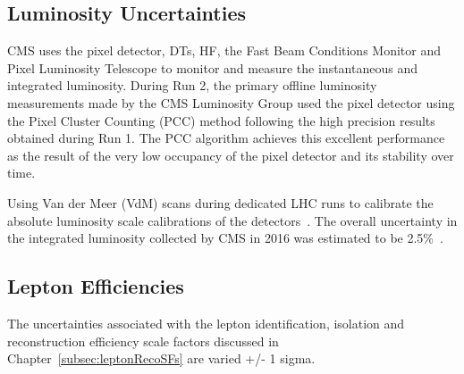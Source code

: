 \subsection{Luminosity Uncertainties}
CMS uses the pixel detector, DTs, HF, the Fast Beam Conditions Monitor and Pixel Luminosity Telescope to monitor and measure the instantaneous and integrated luminosity.
During Run 2, the primary offline luminosity measurements made by the CMS Luminosity Group used the pixel detector using the Pixel Cluster Counting (PCC) method following the high precision results obtained during Run 1.
The PCC algorithm achieves this excellent performance as the result of the very low occupancy of the pixel detector and its stability over time.


Using Van der Meer (VdM) scans during dedicated LHC runs to calibrate the absolute luminosity scale calibrations of the detectors~\cite{vanderMeer:1968zz}.
The overall uncertainty in the integrated luminosity collected by CMS in 2016 was estimated to be 2.5\%~\cite{CMS:2017_lumi}.


\subsection{Lepton Efficiencies}
The uncertainties associated with the lepton identification, isolation and reconstruction efficiency scale factors discussed in Chapter~\ref{subsec:leptonRecoSFs} are varied +/- 1 sigma.



